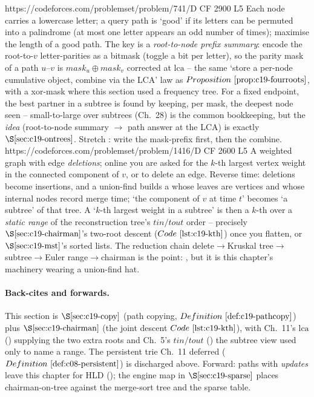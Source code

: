 \begin{practiceset}
    {https://codeforces.com/problemset/problem/741/D}
    {CF 2900 L5}
    {Each node carries a lowercase letter; a query path is `good' if its letters can be permuted into a palindrome (at most one letter appears an odd number of times); maximise the length of a good path. The key is a \emph{root-to-node prefix summary}: encode the root-to-\(v\) letter-parities as a bitmask (toggle a bit per letter), so the parity mask of a path \(u\text{--}v\) is \(\mathit{mask}_u\oplus\mathit{mask}_v\) corrected at \(\mathrm{lca}\) -- the same `store a per-node cumulative object, combine via the LCA' law as \(\propref{c19-fourroots}\), with a xor-mask where this section used a frequency tree. For a fixed endpoint, the best partner in a subtree is found by keeping, per mask, the deepest node seen -- small-to-large over subtrees (Ch.~28) is the common bookkeeping, but the \emph{idea} (root-to-node summary \(\to\) path answer at the LCA) is exactly \(\secref{c19-ontrees}\). Stretch : write the mask-prefix first, then the combine.}
    {https://codeforces.com/problemset/problem/1416/D}
    {CF 2600 L5}
    {A weighted graph with edge \emph{deletions}; online you are asked for the \(k\)-th largest vertex weight in the connected component of \(v\), or to delete an edge. Reverse time: deletions become insertions, and a union-find builds a  whose leaves are vertices and whose internal nodes record merge time; `the component of \(v\) at time \(t\)' becomes `a subtree' of that tree. A `\(k\)-th largest weight in a subtree' is then a \(k\)-th over a \emph{static range} of the reconstruction tree's \(tin/tout\) order -- precisely \(\secref{c19-chairman}\)'s two-root descent (\(\coderef{c19-kth}\)) once you flatten, or \(\secref{c19-mst}\)'s sorted lists. The reduction chain delete\(\to\)Kruskal tree\(\to\)subtree\(\to\)Euler range\(\to\)chairman is the point: , but it is this chapter's machinery wearing a union-find hat.}
\end{practiceset}

\paragraph{Back-cites and forwards.}
This section is \(\secref{c19-copy}\) (path copying, \(\defref{c19-pathcopy}\)) plus \(\secref{c19-chairman}\) (the joint descent \(\coderef{c19-kth}\)), with Ch.~11's \(\mathrm{lca}\) () supplying the two extra roots and Ch.~5's \(tin/tout\) () the subtree view used only to name a range. The persistent trie Ch.~11 deferred (\(\defref{c08-persistent}\)) is discharged above. Forward: paths with \emph{updates} leave this chapter for HLD (); the engine map in \(\secref{c19-sparse}\) places chairman-on-tree against the merge-sort tree and the sparse table.

